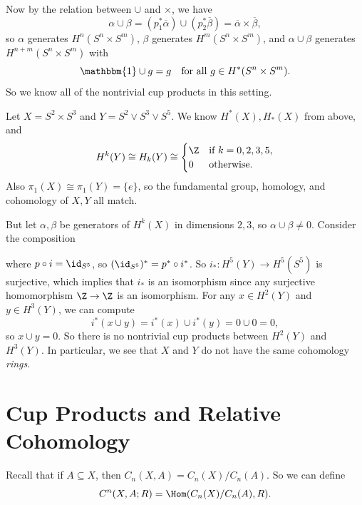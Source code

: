 \begin{example}
  Now by the relation between $\cup$ and
  $\times$, we have
  \[
    \alpha \cup \beta = (p_1^* \overline{\alpha}) \cup (p_2^* \overline{\beta})
    = \overline{\alpha} \times \overline{\beta},
  \]
  so $\alpha$ generates $H^n(S^n \times S^m)$,
  $\beta$ generates $H^m(S^n \times S^m)$, and
  $\alpha \cup \beta$ generates
  $H^{n+m}(S^n \times S^m)$ with
  \[\mathbbm{1} \cup g = g \quad
  \text{for all } g \in H^*(S^n \times S^m).\]
  So we know all of the nontrivial cup products
  in this setting.
\end{example}

\begin{example}
  Let $X = S^2 \times S^3$ and
  $Y = S^2 \lor S^3 \lor S^5$. We know
  $H^*(X), H_*(X)$ from above, and
  \[
    H^k(Y) \cong H_k(Y) \cong
    \begin{cases}
      \Z & \text{if } k = 0, 2, 3, 5, \\
      0 & \text{otherwise}.
    \end{cases}
  \]
  Also $\pi_1(X) \cong \pi_1(Y) = \{e\}$, so
  the fundamental group, homology, and
  cohomology of $X, Y$ all match.

  But let $\alpha, \beta$ be generators of
  $H^k(X)$ in dimensions $2, 3$, so
  $\alpha \cup \beta \ne 0$. Consider the
  composition
  \begin{center}
  \end{center}
  where $p \circ i = \id_{S^5}$, so
  $(\id_{S^5})^* = p^* \circ i^*$.
  So $i_* : H^5(Y) \to H^5(S^5)$ is surjective,
  which implies that $i_*$ is an isomorphism
  since any surjective homomorphism
  $\Z \to \Z$ is an isomorphism.
  For any $x \in H^2(Y)$ and $y \in H^3(Y)$,
  we can compute
  \[
    i^*(x \cup y) = i^*(x) \cup i^*(y) = 0 \cup 0 = 0,
  \]
  so $x \cup y = 0$. So there is no
  nontrivial cup products between
  $H^2(Y)$ and $H^3(Y)$. In particular,
  we see that
  $X$ and $Y$ do not have the same
  cohomology \emph{rings}.
\end{example}

\section{Cup Products and Relative Cohomology}

\begin{definition}
  Recall that if $A \subseteq X$, then
  $C_n(X, A) = C_n(X) / C_n(A)$. So we can
  define
  \[
    C^n(X, A; R) = \Hom(C_n(X) / C_n(A), R).
  \]
\end{definition}

